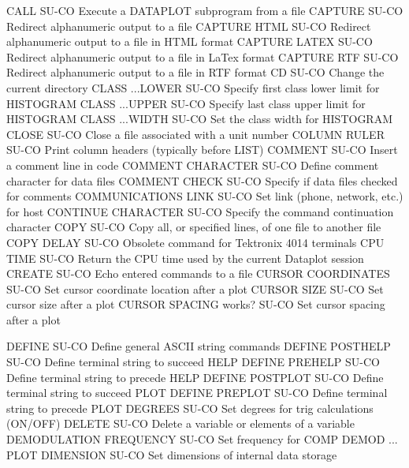 CALL                        SU-CO Execute a DATAPLOT subprogram from a file
CAPTURE                     SU-CO Redirect alphanumeric output to a file
CAPTURE HTML                SU-CO Redirect alphanumeric output to a file in HTML format
CAPTURE LATEX               SU-CO Redirect alphanumeric output to a file in LaTex format
CAPTURE RTF                 SU-CO Redirect alphanumeric output to a file in RTF format
CD                          SU-CO Change the current directory
CLASS ...LOWER              SU-CO Specify first class lower limit for HISTOGRAM
CLASS ...UPPER              SU-CO Specify last class upper limit for HISTOGRAM
CLASS ...WIDTH              SU-CO Set the class width for HISTOGRAM
CLOSE                       SU-CO Close a file associated with a unit number
COLUMN RULER                SU-CO Print column headers (typically before LIST)
COMMENT                     SU-CO Insert a comment line in code
COMMENT CHARACTER           SU-CO Define comment character for data files
COMMENT CHECK               SU-CO Specify if data files checked for comments
COMMUNICATIONS LINK         SU-CO Set link (phone, network, etc.) for host
CONTINUE CHARACTER          SU-CO Specify the command continuation character
COPY                        SU-CO Copy all, or specified lines, of one file to another file
COPY DELAY                  SU-CO Obsolete command for Tektronix 4014 terminals
CPU TIME                    SU-CO Return the CPU time used by the current Dataplot session
CREATE                      SU-CO Echo entered commands to a file
CURSOR COORDINATES          SU-CO Set cursor coordinate location after a plot
CURSOR SIZE                 SU-CO Set cursor size after a plot
CURSOR SPACING works?       SU-CO Set cursor spacing after a plot

DEFINE                      SU-CO Define general ASCII string commands
DEFINE POSTHELP             SU-CO Define terminal string to succeed HELP
DEFINE PREHELP              SU-CO Define terminal string to precede HELP
DEFINE POSTPLOT             SU-CO Define terminal string to succeed PLOT
DEFINE PREPLOT              SU-CO Define terminal string to precede PLOT
DEGREES                     SU-CO Set degrees for trig calculations (ON/OFF)
DELETE                      SU-CO Delete a variable or elements of a variable
DEMODULATION FREQUENCY      SU-CO Set frequency for COMP DEMOD ... PLOT
DIMENSION                   SU-CO Set dimensions of internal data storage


